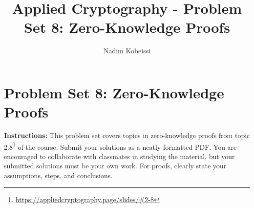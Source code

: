 \documentclass[10pt,a4paper,american]{exam}
\title{Applied Cryptography - Problem Set 8: Zero-Knowledge Proofs}
\author{Nadim Kobeissi}
\begin{document}
\classhandoutheader
\section*{Problem Set 8: Zero-Knowledge Proofs}

\begin{tcolorbox}[colframe=OliveGreen!30!white,colback=OliveGreen!5!white]
	\textbf{Instructions:} This problem set covers topics in zero-knowledge proofs from topic 2.8\footnote{\url{https://appliedcryptography.page/slides/\#2-8}} of the course. Submit your solutions as a neatly formatted PDF. You are encouraged to collaborate with classmates in studying the material, but your submitted solutions must be your own work. For proofs, clearly state your assumptions, steps, and conclusions.
\end{tcolorbox}
\end{document}
